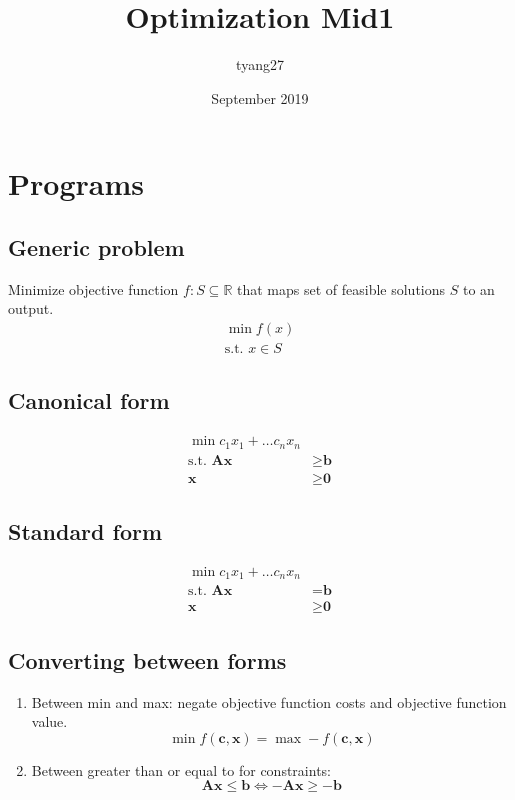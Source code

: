 \documentclass{article}
\title{Optimization Mid1}
\author{tyang27 }
\date{September 2019}
\begin{document}
\maketitle

\section{Programs}
\subsection{Generic problem}
Minimize objective function $f:S\subseteq \mathbb{R}$ that maps set of feasible solutions $S$ to an output.
\begin{align*}
    \min f(x) \\
    \textrm{s.t. } x \in S
\end{align*}
\subsection{Canonical form}
\begin{align*}
    \min c_1x_1 + \dots c_nx_n\\
    \textrm{s.t. } \textbf{Ax} &\geq \textbf{b}\\
    \textbf{x} &\geq \textbf{0}
\end{align*}

\subsection{Standard form}
\begin{align*}
    \min c_1x_1 + \dots c_nx_n\\
    \textrm{s.t. } \textbf{Ax} &= \textbf{b}\\
    \textbf{x} &\geq \textbf{0}
\end{align*}

\subsection{Converting between forms}
\begin{enumerate}
    \item Between min and max: negate objective function costs and objective function value.
    $$\min f(\textbf{c}, \textbf{x}) = \max -f(\textbf{c}, \textbf{x})$$
    \item Between greater than or equal to for constraints: $$\textbf{Ax}\leq \textbf{b} \iff -\textbf{Ax}\geq -\textbf{b}$$
\end{enumerate}{}
\end{document}
